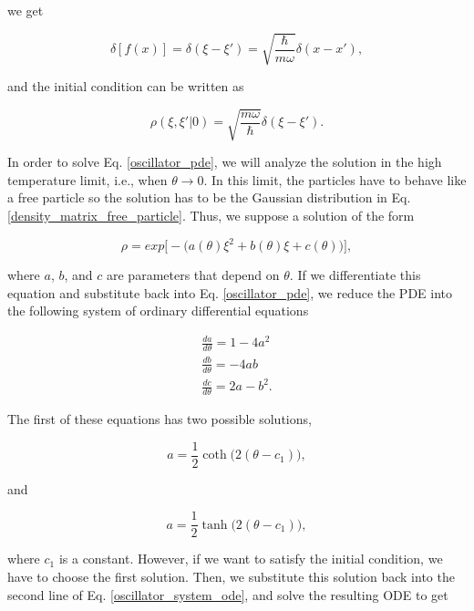 \documentclass{article}
\begin{document}
we get

\begin{equation}
    \delta[f(x)] = \delta(\xi-\xi')=\sqrt{\frac{\hbar}{m\omega}}\delta(x-x'),
\end{equation}

and the initial condition can be written as

\begin{equation}\label{oscillator_pde_initial_condition}
    \rho(\xi,\xi'|0) = \sqrt{\frac{m\omega}{\hbar}} \delta(\xi-\xi').
\end{equation}

In order to solve Eq. \ref{oscillator_pde}, we will analyze the solution in the high temperature limit, i.e., when $\theta \longrightarrow 0$. In this limit, the particles have to behave like a free particle so the solution has to be the Gaussian distribution in Eq. \ref{density_matrix_free_particle}. Thus, we suppose a solution of the form

\begin{equation}\label{oscillator_pre_solution}
    \rho = exp\big[-\big(a(\theta)\xi^{2} + b(\theta)\xi + c(\theta)\big)\big],
\end{equation}

where $a$, $b$, and $c$ are parameters that depend on $\theta$. If we differentiate this equation and substitute back into Eq. \ref{oscillator_pde}, we reduce the PDE into the following system of ordinary differential equations

\begin{equation}\label{oscillator_system_ode}
    \begin{split}
        \frac{d a}{d\theta} = 1 - 4a^{2} \\ \frac{d b}{d\theta}=-4ab \\ \frac{dc}{d\theta}=2a-b^{2}.
    \end{split}
\end{equation}

The first of these equations has two possible solutions,

\begin{equation}
    a = \frac{1}{2} \coth\big(2(\theta - c_{1})\big),
\end{equation}

and 

\begin{equation}
    a = \frac{1}{2} \tanh\big(2(\theta - c_{1})\big),
\end{equation}

where $c_{1}$ is a constant.
However, if we want to satisfy the initial condition, we have to choose the first solution. Then, we substitute this solution back into the second line of Eq. \ref{oscillator_system_ode}, and solve the resulting ODE to get
\end{document}

